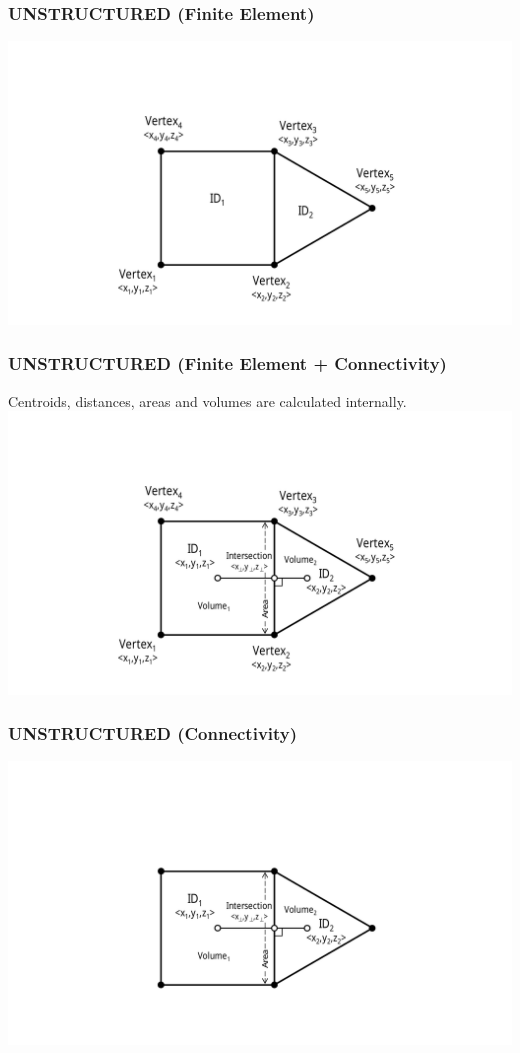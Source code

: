 \documentclass{beamer}
\begin{document}
\begin{frame}[fragile]\frametitle{UNSTRUCTURED (Finite Element)}
\vspace{0.2in}
\centering
\includegraphics[width=1\linewidth]{./fe_raw}
\end{frame}

\begin{frame}[fragile]\frametitle{UNSTRUCTURED (Finite Element + Connectivity)}
Centroids, distances, areas and volumes are calculated internally.
\vspace{0.2in}
\centering
\includegraphics[width=1\linewidth]{./fe_all}
\end{frame}

\begin{frame}[fragile]\frametitle{UNSTRUCTURED (Connectivity)}
\vspace{0.2in}
\centering
\includegraphics[width=1\linewidth]{./fe_dual}
\end{frame}
\end{document}
